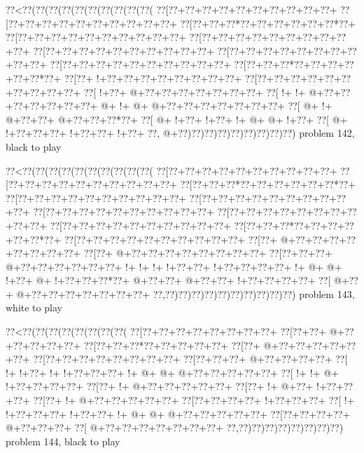 \vbox{\vbox{\goo
\0??<\0??(\0??(\0??(\0??(\0??(\0??(\0??(\0??(\0??(\0??(
\0??[\0??+\0??+\0??+\0??+\0??+\0??+\0??+\0??+\0??+\0??+
\0??[\0??+\0??+\0??+\0??+\0??+\0??+\0??+\0??+\0??+\0??+
\0??[\0??+\0??+\0??*\0??+\0??+\0??+\0??+\0??+\0??*\0??+
\0??[\0??+\0??+\0??+\0??+\0??+\0??+\0??+\0??+\0??+\0??+
\0??[\0??+\0??+\0??+\0??+\0??+\0??+\0??+\0??+\0??+\0??+
\0??[\0??+\0??+\0??+\0??+\0??+\0??+\0??+\0??+\0??+\0??+
\0??[\0??+\0??+\0??+\0??+\0??+\0??+\0??+\0??+\0??+\0??+
\0??[\0??+\0??+\0??+\0??+\0??+\0??+\0??+\0??+\0??+\0??+
\0??[\0??+\0??+\0??*\0??+\0??+\0??+\0??+\0??+\0??*\0??+
\0??[\0??+\- !+\0??+\0??+\0??+\0??+\0??+\0??+\0??+\0??+
\0??[\0??+\0??+\0??+\0??+\0??+\0??+\0??+\0??+\0??+\0??+
\0??[\- !+\0??+\- @+\0??+\0??+\0??+\0??+\0??+\0??+\0??+
\0??[\- !+\- !+\- @+\0??+\0??+\0??+\0??+\0??+\0??+\0??+
\- @+\- !+\- @+\- @+\0??+\0??+\0??+\0??+\0??+\0??+\0??+
\0??[\- @+\- !+\- @+\0??+\0??+\- @+\0??+\0??+\0??*\0??+
\0??[\- @+\- !+\0??+\- !+\0??+\- !+\- @+\- @+\- !+\0??+
\0??[\- @+\- !+\0??+\0??+\0??+\- !+\0??+\0??+\- !+\0??+
\0??,\- @+\0??)\0??)\0??)\0??)\0??)\0??)\0??)\0??)\0??)
}
\hfil problem 142, black to play\hfil\break
}

\vbox{\vbox{\goo
\0??<\0??(\0??(\0??(\0??(\0??(\0??(\0??(\0??(\0??(\0??(
\0??[\0??+\0??+\0??+\0??+\0??+\0??+\0??+\0??+\0??+\0??+
\0??[\0??+\0??+\0??+\0??+\0??+\0??+\0??+\0??+\0??+\0??+
\0??[\0??+\0??+\0??*\0??+\0??+\0??+\0??+\0??+\0??*\0??+
\0??[\0??+\0??+\0??+\0??+\0??+\0??+\0??+\0??+\0??+\0??+
\0??[\0??+\0??+\0??+\0??+\0??+\0??+\0??+\0??+\0??+\0??+
\0??[\0??+\0??+\0??+\0??+\0??+\0??+\0??+\0??+\0??+\0??+
\0??[\0??+\0??+\0??+\0??+\0??+\0??+\0??+\0??+\0??+\0??+
\0??[\0??+\0??+\0??+\0??+\0??+\0??+\0??+\0??+\0??+\0??+
\0??[\0??+\0??+\0??*\0??+\0??+\0??+\0??+\0??+\0??*\0??+
\0??[\0??+\0??+\0??+\0??+\0??+\0??+\0??+\0??+\0??+\0??+
\0??[\0??+\- @+\0??+\0??+\0??+\0??+\0??+\0??+\0??+\0??+
\0??[\0??+\- @+\0??+\0??+\0??+\0??+\0??+\0??+\0??+\0??+
\0??[\0??+\0??+\0??+\- @+\0??+\0??+\0??+\0??+\0??+\0??+
\- !+\- !+\- !+\- !+\0??+\0??+\- !+\0??+\0??+\0??+\0??+
\- !+\- @+\- @+\- !+\0??+\- @+\- !+\0??+\0??+\0??*\0??+
\- @+\0??+\0??+\- @+\0??+\0??+\- !+\0??+\0??+\0??+\0??+
\0??[\- @+\0??+\- @+\0??+\0??+\0??+\0??+\0??+\0??+\0??+
\0??,\0??)\0??)\0??)\0??)\0??)\0??)\0??)\0??)\0??)\0??)
}
\hfil problem 143, white to play\hfil\break
}

\vbox{\vbox{\goo
\0??<\0??(\0??(\0??(\0??(\0??(\0??(\0??(\0??(
\0??[\0??+\0??+\0??+\0??+\0??+\0??+\0??+\0??+
\0??[\0??+\0??+\- @+\0??+\0??+\0??+\0??+\0??+
\0??[\0??+\0??+\0??*\0??+\0??+\0??+\0??+\0??+
\0??[\0??+\- @+\0??+\0??+\0??+\0??+\0??+\0??+
\0??[\0??+\0??+\0??+\0??+\0??+\0??+\0??+\0??+
\0??[\0??+\0??+\0??+\- @+\0??+\0??+\0??+\0??+
\0??[\- !+\- !+\0??+\- !+\- !+\0??+\0??+\0??+
\- !+\- @+\- @+\- @+\0??+\0??+\0??+\0??+\0??+
\0??[\- !+\- !+\- @+\- !+\0??+\0??+\0??+\0??+
\0??[\0??+\- !+\- @+\0??+\0??+\0??+\0??+\0??+
\0??[\0??+\- !+\- @+\0??+\- !+\0??+\0??+\0??+
\0??[\0??+\- !+\- @+\0??+\0??+\0??+\0??+\0??+
\0??[\0??+\0??+\0??+\0??+\- !+\0??+\0??+\0??+
\0??[\- !+\- !+\0??+\0??+\0??+\- !+\0??+\0??+
\- !+\- @+\- @+\- @+\0??+\0??+\0??+\0??+\0??+
\0??[\0??+\0??+\0??+\0??+\- @+\0??+\0??+\0??+
\0??[\- @+\0??+\0??+\0??+\0??+\0??+\0??+\0??+
\0??,\0??)\0??)\0??)\0??)\0??)\0??)\0??)\0??)
}
\hfil problem 144, black to play\hfil\break
}

